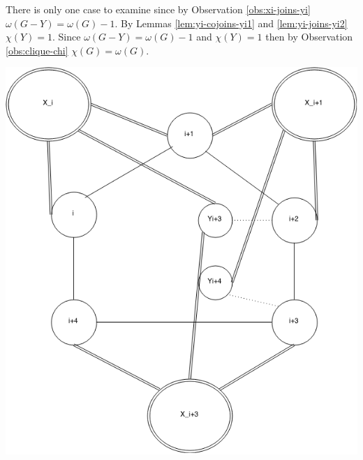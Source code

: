\documentclass[12pt]{article}
\begin{document}
\begin{minipage}{0.5\textwidth}%
	 There is only one case to examine since by Observation \ref{obs:xi-joins-yi} $\omega(G - Y) = \omega(G) - 1 $. By Lemmas \ref{lem:yi-cojoins-yi1} and \ref{lem:yi-joins-yi2}  $\chi(Y) = 1$. Since $\omega(G - Y) = \omega(G) - 1$ and $\chi(Y) =1 $ then by Observation \ref{obs:clique-chi} $\chi(G) = \omega(G)$.
\end{minipage}
\hfill
\begin{minipage}{0.5\textwidth}\raggedleft
	\includegraphics[width=\linewidth]{Yi3-Yi4.png}
\end{minipage}
\clearpage
\end{document}

